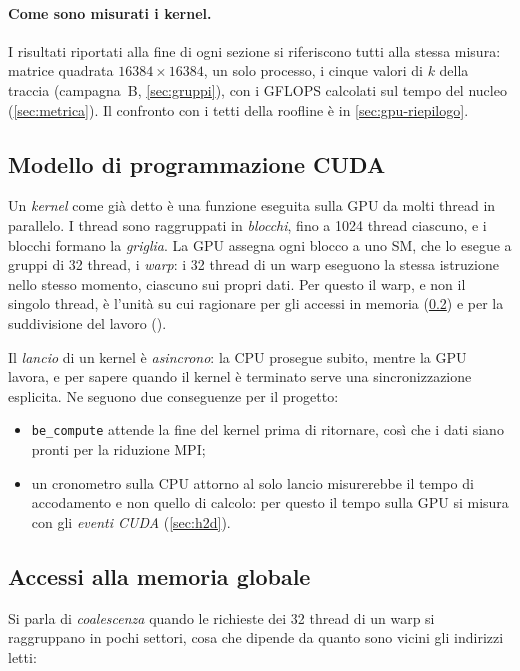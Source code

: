 \documentclass[11pt,a4paper]{article}
\begin{document}
\paragraph{Come sono misurati i kernel.} I risultati riportati alla fine di
ogni sezione si riferiscono tutti alla stessa misura: matrice quadrata
$16384 \times 16384$, un solo processo, i cinque valori di $k$ della traccia
(campagna~B, \cref{sec:gruppi}), con i GFLOPS calcolati sul tempo del nucleo
(\cref{sec:metrica}). Il confronto con i tetti della roofline è in
\cref{sec:gpu-riepilogo}.

\subsection{Modello di programmazione CUDA}\label{sec:cuda-modello}

Un \emph{kernel} come già detto è una funzione eseguita sulla GPU da molti thread in
parallelo. I thread sono raggruppati in \emph{blocchi}, fino a 1024 thread
ciascuno, e i blocchi formano la \emph{griglia}. La GPU assegna ogni blocco a
uno SM, che lo esegue a gruppi di 32 thread, i \emph{warp}: i 32 thread di un
warp eseguono la stessa istruzione nello stesso momento, ciascuno sui propri
dati. Per questo il warp, e non il singolo thread, è l'unità su cui ragionare
per gli accessi in memoria (\cref{sec:coalescenza}) e per la suddivisione del
lavoro ().

Il \emph{lancio} di un kernel è \emph{asincrono}: la CPU prosegue subito,
mentre la GPU lavora, e per sapere quando il kernel è terminato serve una
sincronizzazione esplicita. Ne seguono due conseguenze per il progetto:
\begin{itemize}
  \item \texttt{be\_compute} attende la fine del kernel prima di ritornare,
        così che i dati siano pronti per la riduzione MPI;
  \item un cronometro sulla CPU attorno al solo lancio misurerebbe il tempo di
        accodamento e non quello di calcolo: per questo il tempo sulla GPU si
        misura con gli \emph{eventi CUDA} (\cref{sec:h2d}).
\end{itemize}

\subsection{Accessi alla memoria globale}\label{sec:coalescenza}

Si parla di \emph{coalescenza} quando le richieste dei 32 thread di un warp si
raggruppano in pochi settori, cosa che dipende da quanto sono vicini gli
indirizzi letti:
\end{document}
